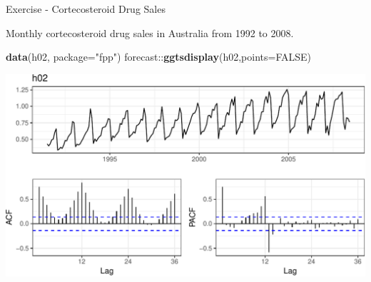 \documentclass[11pt,ignorenonframetext,]{beamer}
\newenvironment{Shaded}{}{}
\newcommand{\DataTypeTok}[1]{\textcolor[rgb]{0.56,0.13,0.00}{#1}}
\newcommand{\KeywordTok}[1]{\textcolor[rgb]{0.00,0.44,0.13}{\textbf{#1}}}
\newcommand{\NormalTok}[1]{#1}
\newcommand{\OperatorTok}[1]{\textcolor[rgb]{0.40,0.40,0.40}{#1}}
\newcommand{\OtherTok}[1]{\textcolor[rgb]{0.00,0.44,0.13}{#1}}
\newcommand{\StringTok}[1]{\textcolor[rgb]{0.25,0.44,0.63}{#1}}
\let\oldShaded\Shaded
\let\endoldShaded\endShaded
\renewenvironment{Shaded}{\footnotesize\begin{spacing}{0.9}\oldShaded}{\endoldShaded\end{spacing}}
\begin{document}
\begin{frame}[fragile]{%
\protect\hypertarget{exercise---cortecosteroid-drug-sales}{%
Exercise - Cortecosteroid Drug Sales}}

Monthly cortecosteroid drug sales in Australia from 1992 to 2008.

\begin{Shaded}
\begin{Highlighting}[]
\KeywordTok{data}\NormalTok{(h02, }\DataTypeTok{package=}\StringTok{"fpp"}\NormalTok{)}
\NormalTok{forecast}\OperatorTok{::}\KeywordTok{ggtsdisplay}\NormalTok{(h02,}\DataTypeTok{points=}\OtherTok{FALSE}\NormalTok{)}
\end{Highlighting}
\end{Shaded}

\begin{center}\includegraphics[width=\textwidth]{Lec11_files/figure-beamer/unnamed-chunk-33-1} \end{center}

\end{frame}
\end{document}
